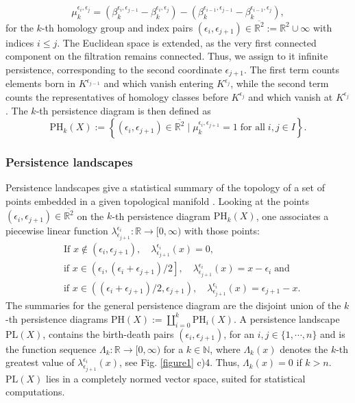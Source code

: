 \documentclass[runningheads,orivec]{llncs}
\begin{document}
\begin{equation}
\mu^{\epsilon_{i},\epsilon_{j}}_k = (\beta_k^{\epsilon_{i},\epsilon_{j-1}} - \beta_k^{\epsilon_i,\epsilon_{j}})-(\beta_k^{\epsilon_{i-1},\epsilon_{j-1}}-\beta_k^{\epsilon_{i-1},\epsilon_{j}}),
\end{equation}
for the $k$-th homology group and index pairs $(\epsilon_i,\epsilon_{j+1}) \in \overline{\mathbb{R}^2} := \mathbb{R}^2 \cup \infty$ with indices $i \leq j$. The Euclidean space is extended, as the very first connected component on the filtration remains connected. Thus, we assign to it infinite persistence, corresponding to the second coordinate $\epsilon_{j+1}$. The first term counts elements born in $K^{\epsilon_{j-1}}$ and which vanish entering $K^{\epsilon_{j}}$, while the second term counts the representatives of homology classes before $K^{\epsilon_{j}}$ and which vanish at $K^{\epsilon_{j}}$. The $k$-th persistence diagram is then defined as
\begin{equation}
\text{PH}_{k}(X) := \left\{(\epsilon_i, \epsilon_{j+1}) \in \overline{\mathbb{R}^2} \; \bigg\vert \; \mu^{\epsilon_{i},\epsilon_{j+1}}_k = 1 \; \text{for all} \; i,j \in I \right\}.
\end{equation}

\subsubsection{Persistence landscapes} Persistence landscapes give a statistical summary of the topology of a set of points embedded in a given topological manifold \cite{bubenik2015statistical}. Looking at the points $(\epsilon_i,\epsilon_{j+1}) \in \overline{\mathbb{R}^2}$ on the $k$-th persistence diagram $\text{PH}_{k}(X)$, one associates a piecewise linear function $\lambda^{\epsilon_i}_{\epsilon_{j+1}}: \mathbb{R} \rightarrow [0,\infty)$ with those points:
\begin{align}
    &\text{If } x \not\in (\epsilon_i,\epsilon_{j+1}), \quad \lambda^{\epsilon_i}_{\epsilon_{j+1}}(x) = 0,\\
    &\text{if } x \in \left(\epsilon_{i},(\epsilon_i + \epsilon_{j+1})/2 \right], \quad \lambda^{\epsilon_i}_{\epsilon_{j+1}}(x) = x - \epsilon_{i} \; \text{and}\\
    &\text{if } x \in \left((\epsilon_i + \epsilon_{j+1})/2,\epsilon_{j+1} \right), \quad \lambda^{\epsilon_i}_{\epsilon_{j+1}}(x) = \epsilon_{j+1} - x.
\end{align}
The summaries for the general persistence diagram are the disjoint union of the $k$-th persistence diagrams $\text{PH}(X) := \coprod_{i=0}^{k} \text{PH}_i(X)$. A persistence landscape $\text{PL}(X)$, contains the birth-death pairs $(\epsilon_i,\epsilon_{j+1})$, for an $i,j \in \{1, \cdots, n\}$ and is the function sequence $\Lambda_k : \mathbb{R} \rightarrow [0,\infty)$ for a $k \in \mathbb{N}$, where $\Lambda_k(x)$ denotes the $k$-th greatest value of $\lambda^{\epsilon_i}_{\epsilon_{j+1}}(x)$, see Fig. \ref{figure1} c)4. Thus, $\Lambda_k(x) = 0$ if $k > n$. $\text{PL}(X)$ lies in a completely normed vector space, suited for statistical computations.
\end{document}
